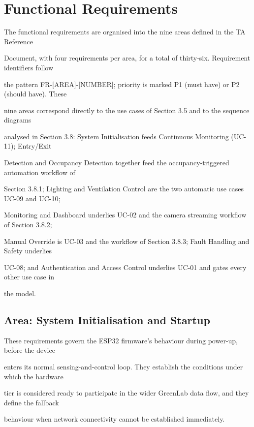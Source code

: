 \section{Functional Requirements}
The functional requirements are organised into the nine areas defined in the TA Reference

Document, with four requirements per area, for a total of thirty-six. Requirement identifiers follow

the pattern FR-[AREA]-[NUMBER]; priority is marked P1 (must have) or P2 (should have). These

nine areas correspond directly to the use cases of Section 3.5 and to the sequence diagrams

analysed in Section 3.8: System Initialisation feeds Continuous Monitoring (UC-11); Entry/Exit

Detection and Occupancy Detection together feed the occupancy-triggered automation workflow of

Section 3.8.1; Lighting and Ventilation Control are the two automatic use cases UC-09 and UC-10;

Monitoring and Dashboard underlies UC-02 and the camera streaming workflow of Section 3.8.2;

Manual Override is UC-03 and the workflow of Section 3.8.3; Fault Handling and Safety underlies

UC-08; and Authentication and Access Control underlies UC-01 and gates every other use case in

the model.


\subsection{Area: System Initialisation and Startup}
These requirements govern the ESP32 firmware's behaviour during power-up, before the device

enters its normal sensing-and-control loop. They establish the conditions under which the hardware

tier is considered ready to participate in the wider GreenLab data flow, and they define the fallback

behaviour when network connectivity cannot be established immediately.

